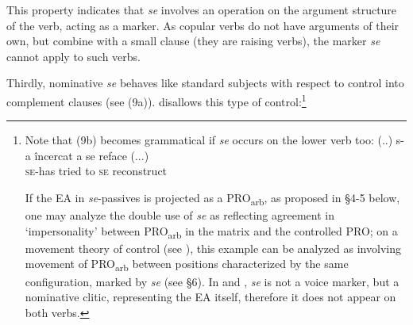 \documentclass[output=paper]{langsci/langscibook}
\begin{document}
\ea%
    \label{ex:giurgea:8}
    \z
\z


This property indicates that   \textit{se} involves an operation on the argument structure of the verb, acting as a  marker. As copular verbs do not have arguments of their own, but combine with a small clause (they are raising verbs), the  marker \textit{se} cannot apply to such verbs.

Thirdly, nominative \textit{se} behaves like standard subjects with respect to control into complement clauses (see (9a)).  disallows this type of control:\footnote{Note that (9b) becomes grammatical if \textit{se} occurs on the lower verb too:
    \ea \gll  (..) s-a       încercat a   se  reface (...)\\
              {} \textsc{se-}has tried        to \textsc{se} reconstruct\\
    \z

    If the EA in \textit{se}{}-passives is projected as a PRO\textsubscript{arb}, as proposed in §4-5 below, one may analyze the double use of \textit{se} as reflecting agreement in ‘impersonality' between PRO\textsubscript{arb} in the matrix and the controlled PRO; on a movement theory of control (see \citealt{Hornstein1999}), this example can be analyzed as involving movement of PRO\textsubscript{arb} between positions characterized by the same  configuration, marked by \textit{se} (see §6). In  and , \textit{se} is not a voice marker, but a nominative clitic, representing the EA itself, therefore it does not appear on both verbs.}
\end{document}
